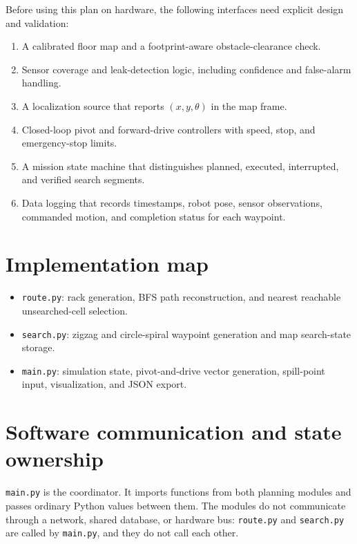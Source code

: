 \documentclass[11pt]{article}
\begin{document}
Before using this plan on hardware, the following interfaces need explicit
design and validation:
\begin{enumerate}
  \item A calibrated floor map and a footprint-aware obstacle-clearance check.
  \item Sensor coverage and leak-detection logic, including confidence and
        false-alarm handling.
  \item A localization source that reports $(x,y,\theta)$ in the map frame.
  \item Closed-loop pivot and forward-drive controllers with speed, stop, and
        emergency-stop limits.
  \item A mission state machine that distinguishes planned, executed,
        interrupted, and verified search segments.
  \item Data logging that records timestamps, robot pose, sensor observations,
        commanded motion, and completion status for each waypoint.
\end{enumerate}

\section{Implementation map}

\begin{itemize}
  \item \texttt{route.py}: rack generation, BFS path reconstruction, and
        nearest reachable unsearched-cell selection.
  \item \texttt{search.py}: zigzag and circle-spiral waypoint generation and
        map search-state storage.
  \item \texttt{main.py}: simulation state, pivot-and-drive vector generation,
        spill-point input, visualization, and JSON export.
\end{itemize}

\section{Software communication and state ownership}

\texttt{main.py} is the coordinator. It imports functions from both planning
modules and passes ordinary Python values between them. The modules do not
communicate through a network, shared database, or hardware bus:
\texttt{route.py} and \texttt{search.py} are called by \texttt{main.py}, and
they do not call each other.
\end{document}
